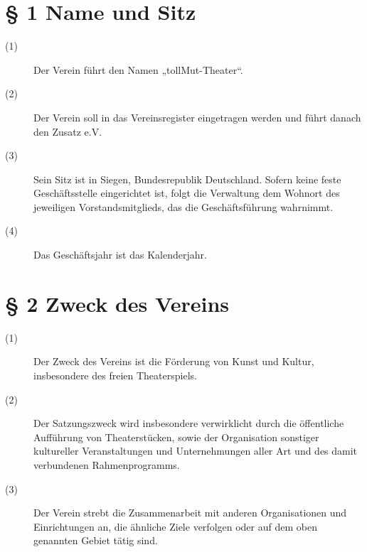 \documentclass[a4paper,12pt]{scrartcl}
\begin{document}
\newpage

\tableofcontents
\thispagestyle{empty}
\clearpage



\renewcommand{\sectionmark}[1]{\markright{#1}}
\renewcommand{\subsectionmark}[1]{}
\renewcommand{\subsubsectionmark}[1]{}
\rhead{\today}

\onehalfspacing
\renewcommand{\thesection}{\arabic{section}}
\renewcommand{\thesection}{\arabic{section}}
\setcounter{section}{0}
\setcounter{page}{1}


\section*{\S{} 1 Name und Sitz}
\begin{description} 

\item[(1)] Der Verein führt den Namen „tollMut-Theater“. 
\item[(2)] Der Verein soll in das Vereinsregister eingetragen werden und führt danach den Zusatz e.V.
\item[(3)] Sein Sitz ist in Siegen, Bundesrepublik Deutschland. Sofern keine feste Geschäftsstelle eingerichtet ist, folgt die Verwaltung dem Wohnort des jeweiligen Vorstandsmitglieds, das die Geschäftsführung wahrnimmt. 
\item[(4)] Das Geschäftsjahr ist das Kalenderjahr.

\end{description}



\section*{\S{} 2 Zweck des Vereins}
\begin{description} 

\item[(1)] Der Zweck des Vereins ist die Förderung von Kunst und Kultur, insbesondere des freien Theaterspiels.
\item[(2)] Der Satzungszweck wird insbesondere verwirklicht durch die öffentliche Aufführung von Theaterstücken, sowie der Organisation sonstiger kultureller Veranstaltungen und Unternehmungen aller Art und des damit verbundenen Rahmenprogramms.
\item[(3)] Der Verein strebt die Zusammenarbeit mit anderen Organisationen und Einrichtungen an, die ähnliche Ziele verfolgen oder auf dem oben genannten Gebiet tätig sind.
 
\end{description}
\end{document}
